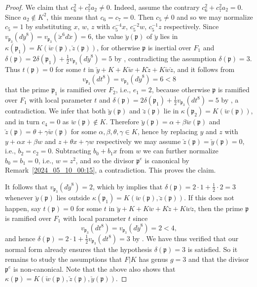 \documentclass[12pt,reqno]{amsart}
\newcommand{\todoo}[2][]{\todo[size=tiny, #1]{#2}} %
\newcommand{\toda}[2][]{\todo[color=blue!30, #1]{#2}} %
\theoremstyle{definition}
\newcommand{\cx}{{\breve{x}}}
\newcommand{\cy}{{\breve{y}}}
\newcommand{\pp}{\mathfrak{p}}
\newcommand{\al}{\alpha}
\newcommand{\be}{\beta}
\newcommand{\te}{\theta}
\newcommand{\ga}{\gamma}
\newcommand{\de}{\delta}
\newcommand{\ka}{\kappa}
\begin{document}
\begin{proof}
We claim that $c_6^2 + c_7^2 a_2 \neq 0$. %
Indeed, assume the contrary $c_6^2 + c_7^2 a_2 = 0$.
Since $a_2 \notin K^2$, this means that $c_6 = c_7 = 0$.
Then $c_5 \neq 0$ and so we may normalize $c_5 = 1$ by substituting $x$, $w$, $z$ with $c_5^{-4} x$, $c_5^{-2} w$, $c_5^{-1} z$ respectively. 
Since $v_{\pp_3}(d\cy^8) = v_{\pp_3}(\cx^6 d\breve{x}) = 6$, the value $\cy(\pp)$ of $\cy$ lies in $\ka({\pp_1}) = K(\breve{w}(\pp),\breve{z}(\pp))$, for otherwise $\pp$ is inertial over $F_1$ and $\de(\pp) = 2 \de(\pp_1) + \frac12 v_{\pp_3}(d\cy^8) = 5$ by \cite[Theorem~2.3]{BedSt87}, contradicting the assumption $\de(\pp)=3$. 
Thus $t(\pp) = 0$ for some $t$ in $\cy + K + K\breve{w} + K\breve{z} + K\breve{w}\breve{z}$, and it follows from
\[ v_{\pp_3}(dt^8) = v_{\pp_3}(d\cy^8) = 6 < 8 \]
that the prime $\pp_1$ is ramified over $F_2$, i.e., $e_1=2$, 
because otherwise $\pp$ is ramified over $F_1$ with local parameter $t$ and $\de(\pp) = 2 \de(\pp_1) + \frac12 v_{\pp_3}(dt^8) = 5$ by \cite[Theorem~2.3]{BedSt87}, a contradiction.
We infer that both $\breve{y}(\pp)$ and $\breve{z}(\pp)$ lie in $\ka(\pp_2)=K(\breve{w}(\pp))$,
and in turn $c_4=0$ as $\breve w(\pp)\notin K$.
Therefore $\breve{y}(\pp) = \al + \be \breve{w}(\pp)$ and $\breve{z}(\pp) = \te + \ga \breve{w}(\pp)$ for some $\al,\be,\te,\ga \in K$, 
hence by replacing $y$ and $z$ with $y + \al x + \be w$ and $z + \te x + \ga w$ respectively 
we may assume $\breve{z}(\pp)=\breve{y}(\pp)=0$, i.e., $b_2=c_2=0$.
Subtracting $b_0 + b_1 x$ from $w$ we can further normalize $b_0 = b_1 = 0$, i.e., $w = z^2$,
and so the divisor $\pp^e$ is canonical by Remark~\ref{2024_05_10_00:15}, a contradiction. This proves the claim.

It follows that $v_{\pp_3}(d\cy^8)=2$,
which by \cite[Theorem~2.3]{BedSt87} implies that $\de(\pp) = 2 \cdot 1 + \frac12 \cdot 2 = 3$ whenever $\cy(\pp)$ lies outside $\ka({\pp_1}) = K(\breve{w}(\pp),\breve{z}(\pp))$.
If this does not happen, say $t(\pp) = 0$ for some $t$ in $\cy + K + K\breve{w} + K\breve{z} + K\breve{w}\breve{z}$, then the prime $\pp$ is ramified over $F_1$ with local parameter $t$ since
\[ v_{\pp_3}(dt^8) = v_{\pp_3}(d\cy^8) = 2 < 4, \]
and hence $\de(\pp) = 2 \cdot 1 + \frac12 v_{\pp_3}(dt^8) = 3$ by \cite[Theorem~2.3]{BedSt87}. 
We have thus verified that our normal form already ensures that the hypothesis $\de(\pp)=3$ is satisfied. 
So it remains to study the assumptions that $F|K$ has genus $g = 3$ and that the divisor $\pp^e$ is non-canonical.
Note that the above also shows that $\ka(\pp) = K(\breve w(\pp),\breve z(\pp), \breve y(\pp))$.


\end{proof}
\end{document}
